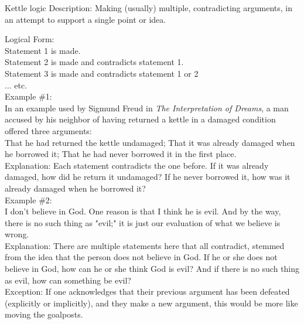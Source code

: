 \documentclass[a4paper,12pt,single,pdftex]{scrartcl}
\begin{document}
Kettle logic
    Description: Making (usually) multiple, contradicting arguments, in an attempt to support a single point or idea.

    
      Logical Form:
    \\

    
      Statement 1 is made.
    \\

    
      Statement 2 is made and contradicts statement 1.
    \\

    
      Statement 3 is made and contradicts statement 1 or 2
    \\

    
      ... etc.
    \\

    
      Example \#1:
    \\

    
      In an example used by Sigmund Freud in {\it The Interpretation of Dreams}, a man accused by his neighbor of having returned a kettle in a damaged condition offered three arguments:
    \\

    
      That he had returned the kettle undamaged; \newline
That it was already damaged when he borrowed it; \newline
That he had never borrowed it in the first place.
    \\

    
      Explanation: Each statement contradicts the one before. If it was already damaged, how did he return it undamaged? If he never borrowed it, how was it already damaged when he borrowed it?
    \\

    
      Example \#2:
    \\

    
      I don't believe in God. One reason is that I think he is evil. And by the way, there is no such thing as "evil;" it is just our evaluation of what we believe is wrong.
    \\

    
      Explanation: There are multiple statements here that all contradict, stemmed from the idea that the person does not believe in God. If he or she does not believe in God, how can he or she think God is evil? And if there is no such thing as evil, how can something be evil?
    \\

    
      Exception: If one acknowledges that their previous argument has been defeated (explicitly or implicitly), and they make a new argument, this would be more like moving the goalposts.
    \\
\end{document}
